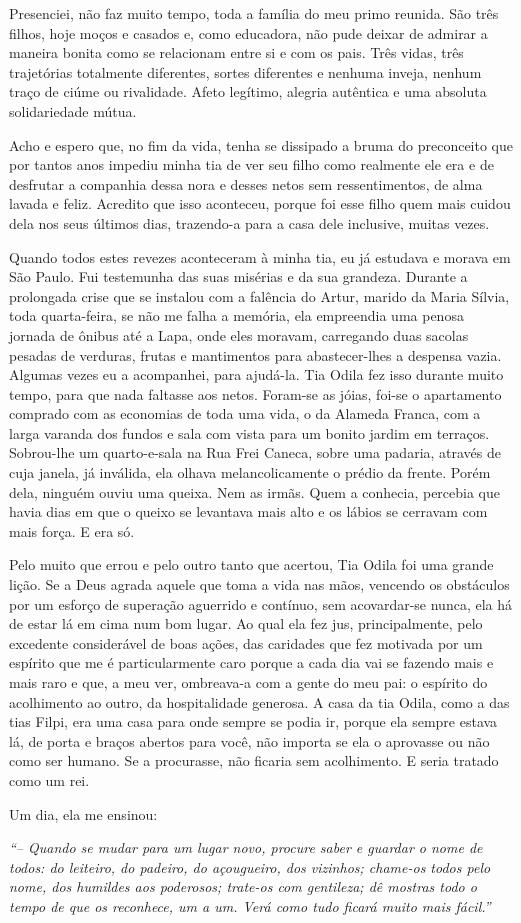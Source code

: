 Presenciei, não faz muito tempo, toda a família do meu primo reunida.
São três filhos, hoje moços e casados e, como educadora, não pude deixar de admirar a maneira bonita como se relacionam entre si e com os pais.
Três vidas, três trajetórias totalmente diferentes, sortes diferentes e nenhuma inveja, nenhum traço de ciúme ou rivalidade.
Afeto legítimo, alegria autêntica e uma absoluta solidariedade mútua.

Acho e espero que, no fim da vida, tenha se dissipado a bruma do preconceito que por tantos anos impediu minha tia de ver seu filho como realmente ele era e de desfrutar a companhia dessa nora e desses netos sem ressentimentos, de alma lavada e feliz.
Acredito que isso aconteceu, porque foi esse filho quem mais cuidou dela nos seus últimos dias, trazendo-a para a casa dele inclusive, muitas vezes.

 
Quando todos estes revezes aconteceram à minha tia, eu já estudava e morava em São Paulo.
Fui testemunha das suas misérias e da sua grandeza.
Durante a prolongada crise que se instalou com a falência do Artur, marido da Maria Sílvia, toda quarta-feira, se não me falha a memória, ela empreendia uma penosa jornada de ônibus até a Lapa, onde eles moravam, carregando duas sacolas pesadas de verduras, frutas e mantimentos para abastecer-lhes a despensa vazia.
Algumas vezes eu a acompanhei, para ajudá-la.
Tia Odila fez isso durante muito tempo, para que nada faltasse aos netos.
Foram-se as jóias, foi-se o apartamento comprado com as economias de toda uma vida, o da Alameda Franca, com a larga varanda dos fundos e sala com vista para um bonito jardim em terraços.
Sobrou-lhe um quarto-e-sala na Rua Frei Caneca, sobre uma padaria, através de cuja janela, já inválida, ela olhava melancolicamente o prédio da frente.
Porém dela, ninguém ouviu uma queixa.
Nem as irmãs.
Quem a conhecia, percebia que havia dias em que o queixo se levantava mais alto e os lábios se cerravam com mais força.
E era só.
 

Pelo muito que errou e pelo outro tanto que acertou, Tia Odila foi uma grande lição.
Se a Deus agrada aquele que toma a vida nas mãos, vencendo os obstáculos por um esforço de superação aguerrido e contínuo, sem acovardar-se nunca, ela há de estar lá em cima num bom lugar.
Ao qual ela fez jus, principalmente, pelo excedente considerável de boas ações, das caridades que fez motivada por um espírito que me é particularmente caro porque a cada dia vai se fazendo mais e mais raro e que, a meu ver, ombreava-a com a gente do meu pai: o espírito do acolhimento ao outro, da hospitalidade generosa.
A casa da tia Odila, como a das tias Filpi, era uma casa para onde sempre se podia ir, porque ela sempre estava lá, de porta e braços abertos para você, não importa se ela o aprovasse ou não como ser humano.
Se a procurasse, não ficaria sem acolhimento.
E seria tratado como um rei.


Um dia, ela me ensinou: 

{\itshape``-- Quando se mudar para um lugar novo, procure saber e guardar o nome de todos: do leiteiro, do padeiro, do açougueiro, dos vizinhos; chame-os todos pelo nome, dos humildes aos poderosos; trate-os com gentileza; dê mostras todo o tempo de que os reconhece, um a um.
Verá como tudo ficará muito mais fácil.''}
